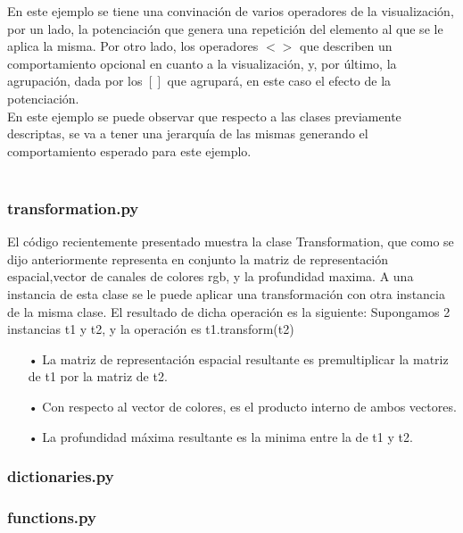 En este ejemplo se tiene una convinaci\'on de varios operadores de la visualizaci\'on, por un lado, la potenciaci\'on que genera una repetici\'on del elemento al que se le aplica la misma. Por otro lado, los operadores $< >$ que describen un comportamiento opcional en cuanto a la visualizaci\'on, y, por \'ultimo, la agrupación, dada por los $[ ]$ que agrupar\'a, en este caso el efecto de la potenciaci\'on. \\
En este ejemplo se puede observar que respecto a las clases previamente descriptas, se va a tener una jerarqu\'ia de las mismas generando el comportamiento esperado para este ejemplo.\\
\\

\newpage
\subsubsection{transformation.py}



El c\'odigo recientemente presentado muestra la clase Transformation, que como se dijo anteriormente representa en conjunto la matriz de representaci\'on espacial,vector de canales de colores rgb, y la profundidad maxima.
A una instancia de esta clase se le puede aplicar una transformaci\'on con otra instancia de la misma clase. El resultado de dicha operaci\'on es la siguiente:
Supongamos 2 instancias t1 y t2, y la operaci\'on es t1.transform(t2)
\begin{itemize}
\item[•] La matriz de representaci\'on espacial resultante es premultiplicar la matriz de t1 por la matriz de t2. 
\item[•] Con respecto al vector de colores, es el producto interno de ambos vectores.
\item[•] La profundidad m\'axima resultante es la minima entre la de t1 y t2. 
\end{itemize}

\newpage
\subsubsection{dictionaries.py}


\newpage
\subsubsection{functions.py}

